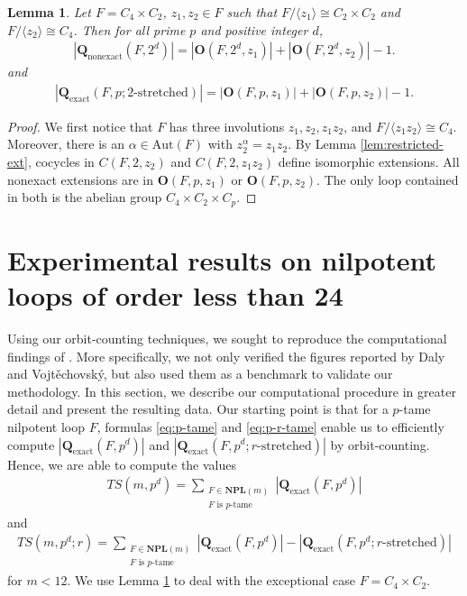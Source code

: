 \documentclass[12pt,a4paper]{amsart}
\newtheorem{lemma}[theorem]{Lemma}
\theoremstyle{definition}
\newcommand{\boldO}{\mathbf{O}}
\newcommand{\boldQexact}{\mathbf{Q}_{\mathrm{exact}}}
\newcommand{\boldQnonexact}{\mathbf{Q}_{\mathrm{nonexact}}}
\newcommand{\NPL}{\mathbf{NPL}}
\begin{document}
\begin{lemma} \label{lem:C4C2}
Let $F=C_4\times C_2$, $z_1,z_2\in F$ such that $F/\langle z_1 \rangle \cong C_2\times C_2$ and $F/\langle z_2 \rangle \cong C_4$. Then for all prime $p$ and positive integer $d$,
\begin{align} \label{eq:C4C2-ext}
|\boldQnonexact(F,2^d)|=|\boldO(F,2^d,z_1)|+|\boldO(F,2^d,z_2)|-1.
\end{align}
and
\begin{align} \label{eq:C4C2-stretched}
|\boldQexact(F,p; \text{$2$-stretched})|=|\boldO(F,p,z_1)|+|\boldO(F,p,z_2)|-1.
\end{align}
\end{lemma}
\begin{proof}
We first notice that $F$ has three involutions $z_1,z_2,z_1z_2$, and $F/\langle z_1z_2 \rangle \cong C_4$. Moreover, there is an $\alpha\in\mathrm{Aut}(F)$ with $z_2^\alpha=z_1z_2$. By Lemma \ref{lem:restricted-ext}, cocycles in $C(F,2,z_2)$ and $C(F,2,z_1z_2)$ define isomorphic extensions. All nonexact extensions are in $\boldO(F,p,z_1)$ or $\boldO(F,p,z_2)$. The only loop contained in both is the abelian group $C_4\times C_2\times C_p$. 
\end{proof}


\section{Experimental results on nilpotent loops of order less than 24}

Using our orbit-counting techniques, we sought to reproduce the computational findings of \cite{DalyVojtechovsky2009}. More specifically, we not only verified the figures reported by Daly and Vojt\v{e}chovsk\'y, but also used them as a benchmark to validate our methodology. In this section, we describe our computational procedure in greater detail and present the resulting data. Our starting point is that for a $p$-tame nilpotent loop $F$, formulas \eqref{eq:p-tame} and \eqref{eq:p-r-tame} enable us to efficiently compute $|\boldQexact(F,p^{d})|$ and $|\boldQexact(F,p^{d};\text{$r$-stretched})|$ by orbit-counting. Hence, we are able to compute the values
\begin{align} \label{eq:NL-m-pd}
TS(m,p^d) = \sum_{\substack{F\in\NPL(m) \\ \text{$F$ is $p$-tame}}} |\boldQexact(F,p^{d})|
\end{align}
and
\begin{align} \label{eq:NL-m-pd-r}
TS(m,p^d;r) = \sum_{\substack{F\in\NPL(m) \\ \text{$F$ is $p$-tame}}} |\boldQexact(F,p^{d})|-|\boldQexact(F,p^d;\text{$r$-stretched})|
\end{align}
for $m<12$. We use Lemma \ref{lem:C4C2} to deal with the exceptional case $F=C_4\times C_2$. 
\end{document}
